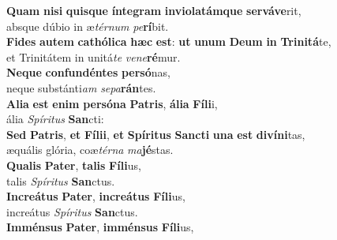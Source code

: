 \evenverse \textbf{Quam} \textbf{ni}\textbf{si} \textbf{quis}\textbf{que} \textbf{ín}\textbf{te}\textbf{gram} \textbf{in}\textbf{vi}\textbf{o}\textbf{la}\textbf{tám}\textbf{que} \textbf{ser}\textbf{vá}\textbf{ve}rit,~\*\\
\evenverse absque dúbio in æ\textit{tér}\textit{num} \textit{pe}\textbf{rí}bit.\\
\oddverse \textbf{Fi}\textbf{des} \textbf{au}\textbf{tem} \textbf{ca}\textbf{thó}\textbf{li}\textbf{ca} \textbf{hæc} \textbf{est}: \textbf{ut} \textbf{u}\textbf{num} \textbf{De}\textbf{um} \textbf{in} \textbf{Tri}\textbf{ni}\textbf{tá}te,~\*\\
\oddverse et Trinitátem in unitá\textit{te} \textit{ve}\textit{ne}\textbf{ré}mur.\\
\evenverse \textbf{Ne}\textbf{que} \textbf{con}\textbf{fun}\textbf{dén}\textbf{tes} \textbf{per}\textbf{só}nas,~\*\\
\evenverse neque substánti\textit{am} \textit{se}\textit{pa}\textbf{rán}tes.\\
\oddverse \textbf{A}\textbf{li}\textbf{a} \textbf{est} \textbf{e}\textbf{nim} \textbf{per}\textbf{só}\textbf{na} \textbf{Pa}\textbf{tris}, \textbf{á}\textbf{li}\textbf{a} \textbf{Fí}\textbf{li}i,~\*\\
\oddverse ália \textit{Spí}\textit{ri}\textit{tus} \textbf{San}cti:\\
\evenverse \textbf{Sed} \textbf{Pa}\textbf{tris}, \textbf{et} \textbf{Fí}\textbf{li}\textbf{i}, \textbf{et} \textbf{Spí}\textbf{ri}\textbf{tus} \textbf{San}\textbf{cti} \textbf{u}\textbf{na} \textbf{est} \textbf{di}\textbf{ví}\textbf{ni}tas,~\*\\
\evenverse æquális glória, coæ\textit{tér}\textit{na} \textit{ma}\textbf{jé}stas.\\
\oddverse \textbf{Qua}\textbf{lis} \textbf{Pa}\textbf{ter}, \textbf{ta}\textbf{lis} \textbf{Fí}\textbf{li}us,~\*\\
\oddverse talis \textit{Spí}\textit{ri}\textit{tus} \textbf{San}ctus.\\
\evenverse \textbf{In}\textbf{cre}\textbf{á}\textbf{tus} \textbf{Pa}\textbf{ter}, \textbf{in}\textbf{cre}\textbf{á}\textbf{tus} \textbf{Fí}\textbf{li}us,~\*\\
\evenverse increátus \textit{Spí}\textit{ri}\textit{tus} \textbf{San}ctus.\\
\oddverse \textbf{Im}\textbf{mén}\textbf{sus} \textbf{Pa}\textbf{ter}, \textbf{im}\textbf{mén}\textbf{sus} \textbf{Fí}\textbf{li}us,~\*\\
